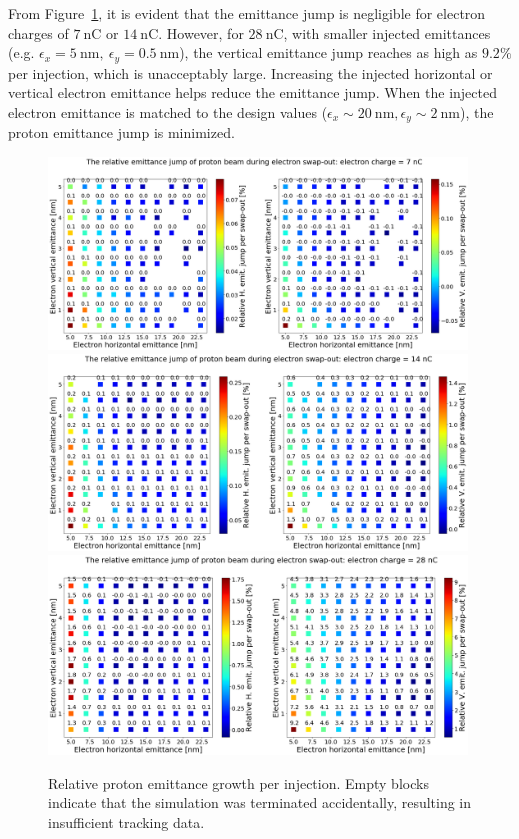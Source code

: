 \documentclass{article}
\begin{document}
From Figure~\ref{fig:protonEmittanceJump}, it is evident that the emittance jump is 
negligible for electron charges of $7~\mathrm{nC}$ or $14~\mathrm{nC}$. 
However, for $28~\mathrm{nC}$, with smaller injected 
emittances (e.g. $\epsilon_x=5~\mathrm{nm},~\epsilon_y=0.5~\mathrm{nm}$), 
the vertical emittance jump reaches as high as $9.2\%$ per injection, which is 
unacceptably large. Increasing the injected horizontal or vertical electron emittance 
helps reduce the emittance jump. When the injected electron emittance is matched to 
the design values ($\epsilon_x\sim 20~\mathrm{nm},\epsilon_y\sim 2~\mathrm{nm}$), 
the proton emittance jump is minimized.

\begin{figure}
    \centering
    \includegraphics[width=0.99\textwidth]{pic/07.png}
    \includegraphics[width=0.99\textwidth]{pic/14.png}
    \includegraphics[width=0.99\textwidth]{pic/28.png}
    \caption{Relative proton emittance growth per injection. Empty blocks indicate that the simulation was terminated accidentally, resulting in insufficient tracking data.}
    \label{fig:protonEmittanceJump}
\end{figure}
\end{document}
